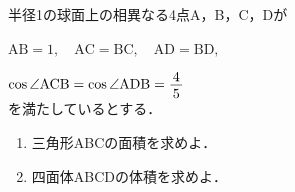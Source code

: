 ﻿\documentclass[../../../uem_mat_tok_q.tex]{subfiles}
\begin{document}
    半径1の球面上の相異なる4点A，B，C，Dが

    \myspaceb%
    $\displaystyle%
        \mathrm{AB}=1,\quad \mathrm{AC}=\mathrm{BC},\quad \mathrm{AD}=\mathrm{BD},%
    $
    
    \myspaceb%
    $\displaystyle%
        \cos\angle\mathrm{ACB}=\cos\angle\mathrm{ADB}=\myfraca{4}{5}%
    $\\
    を満たしているとする．

    \begin{enumerate}
        \item 三角形ABCの面積を求めよ．
        \item 四面体ABCDの体積を求めよ．
    \end{enumerate}
\end{document}
